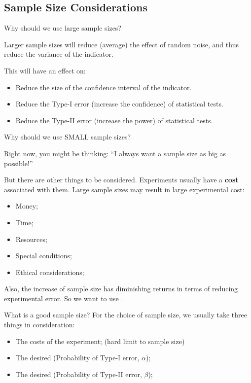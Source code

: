 \subsection{Sample Size Considerations}

\begin{frame}{Why should we use large sample sizes?}{}

  Larger sample sizes will reduce (average) the effect of random
  noise, and thus reduce the variance of the indicator.\bigskip

  This will have an effect on:
  \bigskip

  \begin{itemize}
  \item Reduce the size of the confidence interval of the indicator.
  \item Reduce the Type-I error (increase the confidence) of statistical tests.
  \item Reduce the Type-II error (increase the power) of statistical tests.
  \end{itemize}\bigskip
\end{frame}

\begin{frame}{Why should we use SMALL sample sizes?}{}

  Right now, you might be thinking: ``I always want a sample size as big as possible!''\bigskip

  But there are other things to be considered. Experiments usually
  have a {\bf cost} associated with them. Large sample sizes may
  result in large experimental cost:

  \begin{itemize}
  \item Money;
  \item Time;
  \item Resources;
  \item Special conditions;
  \item Ethical considerations;
  \end{itemize}\bigskip

  Also, the increase of sample size has \alert{diminishing returns} in
  terms of reducing experimental error. So we want to use .
\end{frame}

\begin{frame}{What is a good sample size?}
  For the choice of sample size, we usually take three things in
  consideration:
  \bigskip

  \begin{itemize}
    \item The costs of the experiment; (hard limit to sample size)
    \item The desired  (Probability of Type-I error, $\alpha$);
    \item The desired  (Probability of Type-II error, $\beta$);
  \end{itemize}\bigskip
\end{frame}

